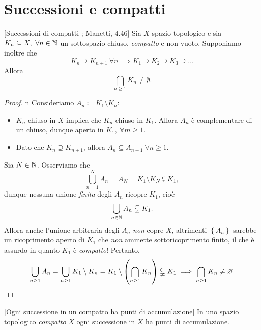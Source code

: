 \section{Successioni e compatti}
\begin{proposition}{}[Successioni di compatti ; Manetti, 4.46]\label{compattocontenuto}
Sia $X$ spazio topologico e sia $K_n\subseteq X,\ \forall n\in\N$ un sottospazio chiuso, \textit{compatto} e non vuoto. Supponiamo inoltre che
\begin{equation*}
K_n\supseteq K_{n+1}\ \forall n\implies K_1\supseteq K_2\supseteq K_3\supseteq \ldots
\end{equation*}
Allora
\begin{equation*}
	\bigcap_{n\geq 1}K_n\neq\emptyset.
\end{equation*}
\end{proposition}
\begin{proof}{n}
Consideriamo $A_n\coloneqq K_1\setminus K_n$:
\begin{itemize}
	\item $K_n$ chiuso in $X$ implica che $K_n$ chiuso in $K_1$. Allora $A_n$ è complementare di un chiuso, dunque aperto in $K_1,\ \forall m\geq 1$.
	\item Dato che $K_n\supseteq K_{n+1}$, allora $A_n\subseteq A_{n+1}\ \forall n\geq 1$.
\end{itemize}
Sia $N\in\N$. Osserviamo che
\begin{equation*}
	\bigcup_{n=1}^{N}A_n=A_N=K_1\setminus K_N\subsetneqq K_1,
\end{equation*}
dunque nessuna unione \textit{finita} degli $A_n$ ricopre $K_1$, cioè
\begin{equation*}
	\bigcup_{n\in\N}A_n\subsetneqq K_1.
\end{equation*}
Allora anche l'unione arbitraria degli $A_n$ \textit{non} copre $X$, altrimenti $\left\{A_n\right\}$ sarebbe un ricoprimento aperto di $K_1$ che \textit{non} ammette sottoricoprimento finito, il che è assurdo in quanto $K_1$ è \textit{compatto}! Pertanto,
\begin{equation*}
\bigcup_{n\geq 1}A_n=\bigcup_{n\geq 1}K_1\setminus K_n=K_1\setminus \left(\bigcap_{n\geq 1}K_n\right)\subsetneqq K_1\implies \bigcap_{n\geq 1}K_n\neq\emptyset.\qedhere
\end{equation*}
\end{proof}
\begin{lemma}{}[Ogni successione in un compatto ha punti di accumulazione]
In uno spazio topologico \textit{compatto} $X$ ogni successione in $X$ ha punti di accumulazione.
\end{lemma}
